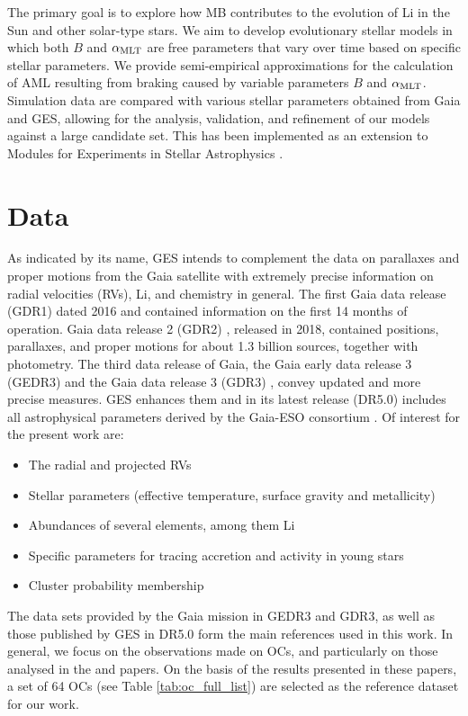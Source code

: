 \documentclass[fleqn,usenatbib]{mnras}
\begin{document}
The primary goal is to explore how MB contributes to the evolution of Li in the Sun and other solar-type stars. We aim to develop evolutionary stellar models in which both $B$ and $\alpha_{\mathrm{MLT}}$ are free parameters that vary over time based on specific stellar parameters. We provide semi-empirical approximations for the calculation of AML resulting from braking caused by variable parameters $B$ and $\alpha_{\mathrm{MLT}}$. Simulation data are compared with various stellar parameters obtained from Gaia and GES, allowing for the analysis, validation, and refinement of our models against a large candidate set. This has been implemented as an extension to Modules for Experiments in Stellar Astrophysics \citep[MESA; ][]{Paxton2011, Paxton2013,Paxton2015, Paxton2018, Paxton2019}.\par


\section{Data} \label{sec_data}
As indicated by its name, GES intends to complement the data on parallaxes and proper motions from the Gaia satellite \citep{Mignard2005} with extremely precise information on radial velocities (RVs), Li, and chemistry in general. The first Gaia data release (GDR1) \citep{Brown2016} dated 2016 and contained information on the first 14 months of operation. Gaia data release 2 (GDR2) \citep{Brown2018}, released in 2018, contained positions, parallaxes, and proper motions for about 1.3 billion sources, together with photometry. The third data release of Gaia, the Gaia early data release 3 (GEDR3) \citep{Brown2021} and the Gaia data release 3 (GDR3) \citep{Brown2022}, convey updated and more precise measures. GES enhances them and in its latest release (DR5.0) includes all astrophysical parameters derived by the Gaia-ESO consortium \citep{Gilmore2022}. Of interest for the present work are:
\begin{itemize}
    \item The radial and projected RVs
    \item Stellar parameters (effective temperature, surface gravity and metallicity)
    \item Abundances of several elements, among them Li
    \item Specific parameters for tracing accretion and activity in young stars
    \item Cluster probability membership
\end{itemize}

The data sets provided by the Gaia mission in GEDR3 and GDR3, as well as those published by GES in DR5.0 form the main references used in this work. In general, we focus on the observations made on OCs, and particularly on those analysed in the \citet{Bragaglia2022} and \citet{Randich2022} papers. On the basis of the results presented in these papers, a set of 64 OCs (see Table \ref{tab:oc_full_list}) are selected as the reference dataset for our work. 
\end{document}
